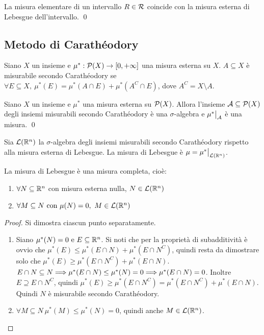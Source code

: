 \begin{prop}
	La misura elementare di un intervallo $R \in \mathcal{R}$ coincide con la misura esterna di Lebesgue dell'intervallo.
	\qed
\end{prop}

\subsection{Metodo di Carathéodory}

\begin{definition}
	Siano $X$ un insieme e $\mu^*:\mathcal{P}(X) \to [0,+\infty]$ una misura esterna su $X$. $A\subseteq X$ è misurabile secondo Carathéodory se $\forall E \subseteq X, \ \mu^*(E)=\mu^*(A\cap E) + \mu^*\left(A^C \cap E\right)$, dove $A^C=X\setminus A$.
\end{definition}

\begin{theorem}
	Siano $X$ un insieme e $\mu^*$ una misura esterna su $\mathcal{P}(X)$. Allora l'insieme $\mathcal{A} \subseteq \mathcal{P}(X)$ degli insiemi misurabili secondo Carathéodory è una $\sigma$-algebra e $\restr{\mu^*}{\A}$ è una misura.
	\qed
\end{theorem}

\begin{definition}
	Sia $\mathcal{L}(\mathbb{R}^n)$ la $\sigma$-algebra degli insiemi misurabili secondo Carathéodory rispetto alla misura esterna di Lebesgue. La misura di Lebesgue è $\mu=\restr{\mu^*}{\mathcal{L}(\R^n)}$.
\end{definition}

\begin{theorem}
	La misura di Lebesgue è una misura completa, cioè:
	\begin{enumerate}
		\item $\forall N \subseteq \mathbb{R}^n$ con misura esterna nulla, $N \in \mathcal{L}(\mathbb{R}^n)$
		\item $\forall M \subseteq N \text{ con } \mu(N)=0, \ M \in \mathcal{L}(\mathbb{R}^n)$
	\end{enumerate}
\end{theorem}

\begin{proof}
	Si dimostra ciascun punto separatamente.
	\begin{enumerate}
		\item Siano $\mu^*(N)=0 \text{ e } E \subseteq \mathbb{R}^n$. Si noti che per la proprietà di subadditività è ovvio che $\mu^*(E)\leq \mu^*(E\cap N)+\mu^*\left(E\cap N^C\right)$, quindi resta da dimostrare solo che $\mu^*(E)\geq\mu^*\left(E\cap N^C\right)+\mu^*(E\cap N)$. $E \cap N \subseteq N\Longrightarrow \mu^*(E\cap N)\leq\mu^*(N)=0\Longrightarrow \mu^*(E\cap N)=0$. Inoltre $E\supseteq E\cap N^C$, quindi $\mu^*(E)\geq \mu^*\left(E\cap N^C\right)=\mu^*\left(E\cap N^C\right)+\mu^*(E\cap N)$. Quindi $N$ è misurabile secondo Carathéodory.
		\item $\forall M\subseteq N \ \mu^*(M)\leq\mu^*(N)=0$, quindi anche $M\in \mathcal{L}(\mathbb{R}^n)$.
	\end{enumerate}
\end{proof}

